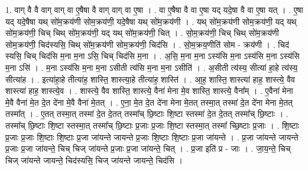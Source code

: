 \documentclass[17pt]{extarticle}
\begin{document}
1. वाग् वै वै वाग् वाग् वा ए॒षैषा वै वाग् वाग् वा ए॒षा । . वा ए॒षैषा वै वा ए॒षा यद् यदे॒षा वै वा ए॒षा यत् । . ए॒षा यद् यदे॒षैषा यथ् सो॑म॒क्रय॑णी सोम॒क्रय॑णी॒ यदे॒षैषा यथ् सो॑म॒क्रय॑णी । . यथ् सो॑म॒क्रय॑णी सोम॒क्रय॑णी॒ यद् यथ् सो॑म॒क्रय॑णी॒ चिच् चिथ् सो॑म॒क्रय॑णी॒ यद् यथ् सो॑म॒क्रय॑णी॒ चित् । . सो॒म॒क्रय॑णी॒ चिच् चिथ् सो॑म॒क्रय॑णी सोम॒क्रय॑णी॒ चिद॑स्यसि॒ चिथ् सो॑म॒क्रय॑णी सोम॒क्रय॑णी॒ चिद॑सि । . सो॒म॒क्रय॒णीति॑ सोम - क्रय॑णी । . चिद॑ स्यसि॒ चिच् चिद॑सि म॒ना म॒ना ऽसि॒ चिच् चिद॑सि म॒ना । . अ॒सि॒ म॒ना म॒ना ऽस्य॑सि म॒ना ऽस्य॑सि म॒ना ऽस्य॑सि म॒ना ऽसि॑ । . म॒ना ऽस्य॑सि म॒ना म॒ना ऽसीती त्य॑सि म॒ना म॒ना ऽसीति॑ । . अ॒सीती त्य॑स्य॒ सीत्या॑ हा॒हे त्य॑स्य॒ सीत्या॑ह । . इत्या॑हा॒हे तीत्या॑ह॒ शास्ति॒ शास्त्या॒हे तीत्या॑ह॒ शास्ति॑ । . आ॒ह॒ शास्ति॒ शास्त्या॑ हाह॒ शास्त्ये॒ वैव शास्त्या॑ हाह॒ शास्त्ये॒व । . शास्त्ये॒ वैव शास्ति॒ शास्त्ये॒ वैना॑ मेना मे॒व शास्ति॒ शास्त्ये॒ वैना᳚म् । . ए॒वैना॑ मेना मे॒वै वैना॑ मे॒त दे॒त दे॑ना मे॒वै वैना॑ मे॒तत् । . ए॒ना॒ मे॒त दे॒त दे॑ना मेना मे॒तत् तस्मा॒त् तस्मा॑ दे॒त दे॑ना मेना मे॒तत् तस्मा᳚त् । . ए॒तत् तस्मा॒त् तस्मा॑ दे॒त दे॒तत् तस्मा᳚च् छि॒ष्टाः शि॒ष्टा स्तस्मा॑ दे॒त दे॒तत् तस्मा᳚च् छि॒ष्टाः । . तस्मा᳚च् छि॒ष्टाः शि॒ष्टा स्तस्मा॒त् तस्मा᳚च् छि॒ष्टाः प्र॒जाः प्र॒जाः शि॒ष्टा स्तस्मा॒त् तस्मा᳚ च्छि॒ष्टाः प्र॒जाः । . शि॒ष्टाः प्र॒जाः प्र॒जाः शि॒ष्टाः शि॒ष्टाः प्र॒जा जा॑यन्ते जायन्ते प्र॒जाः शि॒ष्टाः शि॒ष्टाः प्र॒जा जा॑यन्ते । . प्र॒जा जा॑यन्ते जायन्ते प्र॒जाः प्र॒जा जा॑यन्ते॒ चिच् चिज् जा॑यन्ते प्र॒जाः प्र॒जा जा॑यन्ते॒ चित् । . प्र॒जा इति॑ प्र - जाः । . जा॒य॒न्ते॒ चिच् चिज् जा॑यन्ते जायन्ते॒ चिद॑स्यसि॒ चिज् जा॑यन्ते जायन्ते॒ चिद॑सि । \newline
\end{document}
